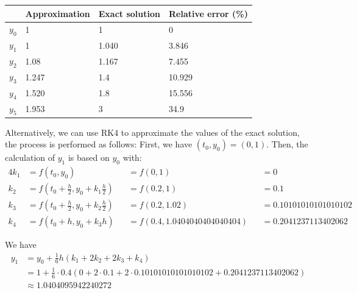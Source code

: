 \documentclass[a4paper]{article}
\begin{document}
\begin{table}[H]
  \centering
  \begin{tabular}{|l|l|l|l|}
    \hline
            & Approximation & Exact solution & Relative error (\%) \\
    \hline
    \(y_0\) & 1             & 1              & 0                   \\
    \hline
    \(y_1\) & 1             & 1.040          & 3.846               \\
    \hline
    \(y_2\) & 1.08          & 1.167          & 7.455               \\
    \hline
    \(y_3\) & 1.247         & 1.4            & 10.929              \\
    \hline
    \(y_4\) & 1.520         & 1.8            & 15.556              \\
    \hline
    \(y_5\) & 1.953         & 3              & 34.9                \\
    \hline
  \end{tabular}
\end{table}

Alternatively, we can use RK4 to approximate the values of the exact solution, the process is performed as follows:
First, we have \((t_0, y_0) = (0, 1)\). Then, the calculation of \(y_1\) is based on \(y_0\) with:
\begin{alignat*}{4}
  k_1 & = f(t_0, y_0)                                            &  & = f(0, 1)                    &  & = 0                   \\
  k_2 & = f \left(t_0 + \frac{h}{2}, y_0 + k_1\frac{h}{2}\right) &  & = f(0.2, 1)                  &  & = 0.1                 \\
  k_3 & = f \left(t_0 + \frac{h}{2}, y_0 + k_2\frac{h}{2}\right) &  & = f(0.2, 1.02)               &  & = 0.10101010101010102 \\
  k_4 & = f(t_0 + h, y_0 + k_3h)                                 &  & = f(0.4, 1.0404040404040404) &  & = 0.2041237113402062
\end{alignat*}

We have
\begin{align*}
  y_1 & = y_0 + \frac{1}{6}h(k_1 + 2k_2 + 2k_3 + k_4)                                                              \\
      & = 1 + \frac{1}{6} \cdot 0.4\left(0 + 2 \cdot 0.1 + 2 \cdot 0.10101010101010102 + 0.2041237113402062\right) \\
      & \approx 1.0404095942240272
\end{align*}
\end{document}
